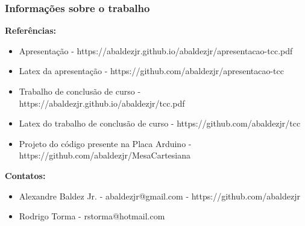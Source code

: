 \begin{frame}
\frametitle{Informações sobre o trabalho}
\tiny

\textbf{Referências:}
\begin{itemize}
    \item Apresentação - https://abaldezjr.github.io/abaldezjr/apresentacao-tcc.pdf
    \item Latex da apresentação - https://github.com/abaldezjr/apresentacao-tcc
    \item Trabalho de conclusão de curso - https://abaldezjr.github.io/abaldezjr/tcc.pdf
    \item Latex do trabalho de conclusão de curso - https://github.com/abaldezjr/tcc
    \item Projeto do código presente na Placa Arduino - https://github.com/abaldezjr/MesaCartesiana
\end{itemize}

\textbf{Contatos:}
\begin{itemize}
    \item Alexandre Baldez Jr. - abaldezjr@gmail.com - https://github.com/abaldezjr
    \item Rodrigo Torma - rstorma@hotmail.com
\end{itemize}

    
\end{frame}
